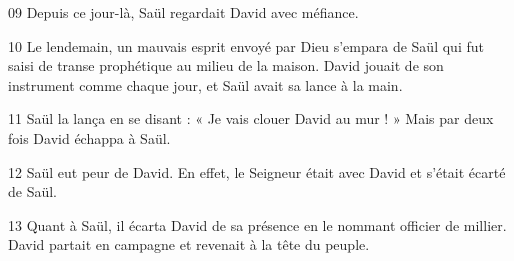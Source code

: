 
09 Depuis ce jour-là, Saül regardait David avec méfiance.

10 Le lendemain, un mauvais esprit envoyé par Dieu s’empara de Saül qui fut saisi de transe prophétique au milieu de la maison. David jouait de son instrument comme chaque jour, et Saül avait sa lance à la main.

11 Saül la lança en se disant : « Je vais clouer David au mur ! » Mais par deux fois David échappa à Saül.

12 Saül eut peur de David. En effet, le Seigneur était avec David et s’était écarté de Saül.

13 Quant à Saül, il écarta David de sa présence en le nommant officier de millier. David partait en campagne et revenait à la tête du peuple.
